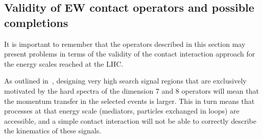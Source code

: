 %
%
%
%


\subsection{Validity of EW contact operators and possible completions}
\label{sub:validityEWContact}

It is important to remember that the operators described in 
this section may present problems in terms of the validity of the contact interaction
approach for the energy scales reached at the LHC. 

As outlined in~\cite{Berlin:2014cfa}, designing very high \MET search signal regions
that are exclusively motivated by the hard \MET spectra of the dimension 7 and 8 operators
will mean that the momentum transfer in the selected events is larger. This in turn
means that processes at that energy scale (mediators, particles exchanged in loops)
are accessible, and a simple contact interaction will not be able to correctly
describe the kinematics of these signals. 


